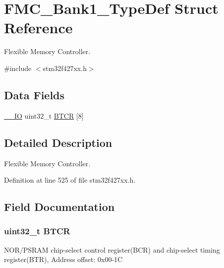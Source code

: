 \hypertarget{struct_f_m_c___bank1___type_def}{}\section{F\+M\+C\+\_\+\+Bank1\+\_\+\+Type\+Def Struct Reference}
\label{struct_f_m_c___bank1___type_def}


Flexible Memory Controller.  




{\ttfamily \#include $<$stm32f427xx.\+h$>$}

\subsection*{Data Fields}
\begin{DoxyCompactItemize}
\item 
\hyperlink{core__sc300_8h_aec43007d9998a0a0e01faede4133d6be}{\+\_\+\+\_\+\+IO} uint32\+\_\+t \hyperlink{struct_f_m_c___bank1___type_def_a83f08fda3308bcc19ca81237248e5f6a}{B\+T\+CR} \mbox{[}8\mbox{]}
\end{DoxyCompactItemize}


\subsection{Detailed Description}
Flexible Memory Controller. 

Definition at line 525 of file stm32f427xx.\+h.



\subsection{Field Documentation}
\subsubsection[{\texorpdfstring{B\+T\+CR}{BTCR}}]{ uint32\+\_\+t B\+T\+CR}\hypertarget{struct_f_m_c___bank1___type_def_a83f08fda3308bcc19ca81237248e5f6a}{}\label{struct_f_m_c___bank1___type_def_a83f08fda3308bcc19ca81237248e5f6a}
N\+O\+R/\+P\+S\+R\+AM chip-\/select control register(\+B\+C\+R) and chip-\/select timing register(\+B\+T\+R), Address offset\+: 0x00-\/1C 

